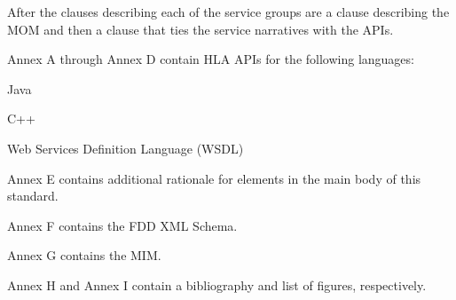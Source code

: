 After the clauses describing each of the service groups are a clause describing the MOM and then a clause that ties the service narratives with the APIs.

\clearpage
Annex A through Annex D contain HLA APIs for the following languages:

\begin{stddashlist}
    \item Java
    \item C++
    \item Web Services Definition Language (WSDL)
\end{stddashlist}

Annex E contains additional rationale for elements in the main body of this standard.

Annex F contains the FDD XML Schema.

Annex G contains the MIM.

Annex H and Annex I contain a bibliography and list of figures, respectively.

